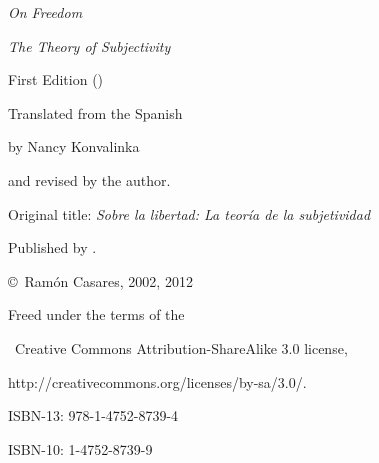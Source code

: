 \vfill
 {\sl On Freedom}\par
 {\sl The Theory of Subjectivity}\par
 First Edition (\todayiso)\par
 \null\par
 Translated from the Spanish\par
 by Nancy Konvalinka\par
 and revised by the author.\par
 Original title: {\sl Sobre la libertad: La teoría de la subjetividad}\par
 \null\par
 Published by .\par
 \copyright\ Ramón Casares, 2002, 2012\par
 Freed under the terms of the\par
 \ccbysa\ {\sf Creative Commons Attribution-ShareAlike 3.0} license,\par
     {http://creativecommons.org/licenses/by-sa/3.0/}.\par
 \null\par
 ISBN-13: 978-1-4752-8739-4\par
 ISBN-10: 1-4752-8739-9\par


\break %

\null
\vfil
{}
\vfil

\vfil
\break %

\null\vfil
\begingroup
\parindent=30pt \baselineskip=15pt

\def\tocleaders{\leaders\hbox to\baselineskip{\hss\bf.\hss}\hfil}

\def\tocline#1{\ifcase#1 \let\next=\toclinezero \or
 \let\next=\toclineone \or \let\next=\toclinetwo
 \else \let\next=\toclineindex \fi \next}

\def\toclinezero#1#2#3#4{\indent{\fonttwo Brief Contents}\par\kern8pt}
\def\toclineone#1#2#3#4{\indent#1\quad \pdfgoto{#4}{#2}\par}
\def\toclinetwo#1#2#3#4{\ignorespaces}
\def\References{References}
\def\toclineindex#1#2#3#4{\def\1{#1}\ifx\1\References\vskip8pt\fi
 \indent#1\quad \pdfgoto{#4}{#2}\par}



\endgroup

\kern2pc
\break

\endinput

